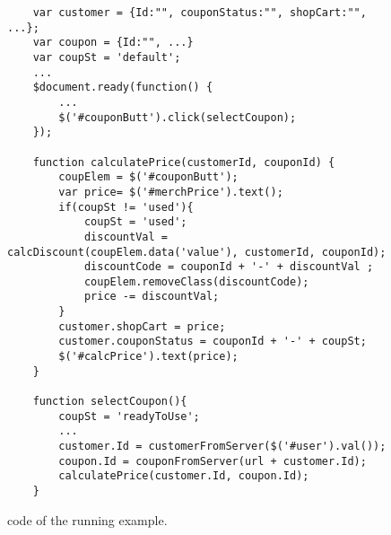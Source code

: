 \begin{figure}
\begin{lstlisting}
	var customer = {Id:"", couponStatus:"", shopCart:"", ...};
	var coupon = {Id:"", ...}
	var coupSt = 'default';
	...
	$document.ready(function() {
		...
		$('#couponButt').click(selectCoupon);
	});
	
	function calculatePrice(customerId, couponId) {
		coupElem = $('#couponButt');
		var price= $('#merchPrice').text();
		if(coupSt != 'used'){
			coupSt = 'used';
			discountVal = calcDiscount(coupElem.data('value'), customerId, couponId);
			discountCode = couponId + '-' + discountVal ;
			coupElem.removeClass(discountCode); 
			price -= discountVal;	
		}
		customer.shopCart = price;
		customer.couponStatus = couponId + '-' + coupSt;
		$('#calcPrice').text(price);  
	}
	
	function selectCoupon(){
		coupSt = 'readyToUse';
		...
		customer.Id = customerFromServer($('#user').val());
		coupon.Id = couponFromServer(url + customer.Id);
		calculatePrice(customer.Id, coupon.Id);
	}

\end{lstlisting}
\vspace{-0.1in} 

\caption{\javascript code of the running example.}
\label{Fig:example}
\vspace{-0.2in} 

\end{figure}